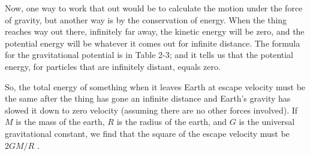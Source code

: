 \documentclass[11pt,oneside]{article}
\begin{document}
Now, one way to work that out would be to calculate the motion under the force of gravity, but another way is by the conservation of energy. When the thing reaches way out there, infinitely far away, the kinetic energy will be zero, and the potential energy will be whatever it comes out for infinite distance. The formula for the gravitational potential is in Table 2-3; and it tells us that the potential energy, for particles that are infinitely distant, equals zero.\par

So, the total energy of something when it leaves Earth at escape velocity must be the same after the thing has gone an infinite distance and Earth's gravity has slowed it down to zero velocity (assuming there are no other forces involved). If \(M\) is the mass of the earth, \(R\) is the radius of the earth, and \(G\) is the universal gravitational constant, we find that the square of the escape velocity must be \(2GM/R\) .\par
\end{document}
